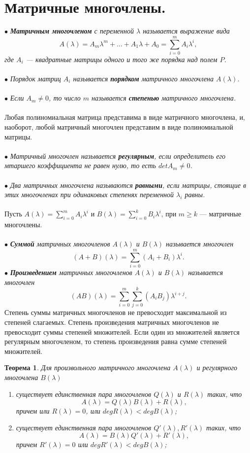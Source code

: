 \section{Матричные многочлены.}
$\bullet$ \textit{\textbf{Матричным многочленом}  с переменной $\lambda$ называется выражение вида} $$A(\lambda) = A_m\lambda^m + \ldots + A_1\lambda + A_0 = \sum\limits_{i=0}^mA_i\lambda^i,$$ \textit{где $A_i$ --- квадратные матрицы одного и того же порядка над полем $P$.}\\\\
$\bullet$ \textit{Порядок матриц $A_i$ называется \textbf{порядком} матричного многочлена $A(\lambda)$.}\\\\
$\bullet$ \textit{Если $A_m \ne 0$, то число $m$ называется \textbf{степенью} матричного многочлена.}\\\\
Любая полиномиальная матрица представима в виде матричного многочлена, и, наоборот, любой матричный многочлен представим в виде полиномиальной матрицы.\\\\
$\bullet$ \textit{Матричный многочлен называется \textbf{регулярным}, если определитель его мтаршего коэффициента не равен нулю, то есть $det A_m \ne 0$.}\\\\
$\bullet$ \textit{Два матричных многочлена называются \textbf{равными}, если матрицы, стоящие в этих многочленах при одинаковых степенях переменной $\lambda_i$ равны.}\\\\
Пусть $A(\lambda) = \sum\limits_{i=0}^mA_i\lambda^i$ и $B(\lambda) = \sum\limits_{i=0}^kB_i\lambda^i$, при $m\geqslant k$ --- матричные многочлены.\\\\
$\bullet$ \textit{\textbf{Суммой} матричных многочленов $A(\lambda)$ и $B(\lambda)$ называется многочлен} $$(A+B)(\lambda)=\sum\limits_{i=0}^m(A_i+B_i)\lambda^i.$$ $\bullet$ \textit{\textbf{Произведением} матричных многочленов $A(\lambda)$ и $B(\lambda)$ называется многочлен} $$(AB)(\lambda)=\sum\limits_{i=0}^m\sum\limits_{j=0}^k(A_iB_j)\lambda^{i+j}.$$
Степень суммы матричных многочленов не превосходит максимальной из степеней слагаемых. Степень произведения матричных многочленов не превосходит суммы степеней множителей. Если один из множителей является регулярным многочленом, то степень произведения равна сумме степеней множителей.
\newtheorem*{th12_5_1}{Теорема}\begin{th12_5_1}
	Для произвольного матричного многочлена $A(\lambda)$ и регулярного многочлена $B(\lambda)$\begin{enumerate}
		\item \textit{существует единственная пара многочленов $Q(\lambda)$ и $R(\lambda)$ таких, что $$A(\lambda) = Q(\lambda)B(\lambda) + R(\lambda),$$ причем или $R(\lambda) = 0$, или $degR(\lambda)< degB(\lambda)$;}
		\item \textit{существует единственная пара многочленов $Q'(\lambda), R'(\lambda)$ таких, что $$A(\lambda) = B(\lambda)Q'(\lambda) + R'(\lambda),$$ причем $R'(\lambda) = 0$ или $degR'(\lambda)< degB(\lambda)$;}
	\end{enumerate}
\end{th12_5_1}
